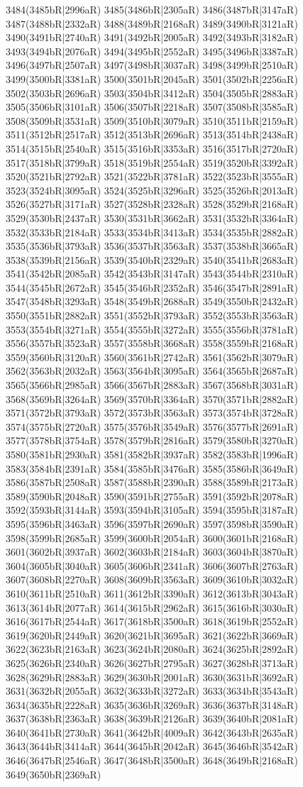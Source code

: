3484(3485bR|2996aR) 3485(3486bR|2305aR) 3486(3487bR|3147aR) 3487(3488bR|2332aR) 3488(3489bR|2168aR) 3489(3490bR|3121aR) 3490(3491bR|2740aR) 3491(3492bR|2005aR) 3492(3493bR|3182aR) 3493(3494bR|2076aR) 3494(3495bR|2552aR) 3495(3496bR|3387aR) 3496(3497bR|2507aR) 3497(3498bR|3037aR) 3498(3499bR|2510aR) 3499(3500bR|3381aR) 3500(3501bR|2045aR) 3501(3502bR|2256aR) 3502(3503bR|2696aR) 3503(3504bR|3412aR) 3504(3505bR|2883aR) 3505(3506bR|3101aR) 3506(3507bR|2218aR) 3507(3508bR|3585aR) 3508(3509bR|3531aR) 3509(3510bR|3079aR) 3510(3511bR|2159aR) 3511(3512bR|2517aR) 3512(3513bR|2696aR) 3513(3514bR|2438aR) 3514(3515bR|2540aR) 3515(3516bR|3353aR) 3516(3517bR|2720aR) 3517(3518bR|3799aR) 3518(3519bR|2554aR) 3519(3520bR|3392aR) 3520(3521bR|2792aR) 3521(3522bR|3781aR) 3522(3523bR|3555aR) 3523(3524bR|3095aR) 3524(3525bR|3296aR) 3525(3526bR|2013aR) 3526(3527bR|3171aR) 3527(3528bR|2328aR) 3528(3529bR|2168aR) 3529(3530bR|2437aR) 3530(3531bR|3662aR) 3531(3532bR|3364aR) 3532(3533bR|2184aR) 3533(3534bR|3413aR) 3534(3535bR|2882aR) 3535(3536bR|3793aR) 3536(3537bR|3563aR) 3537(3538bR|3665aR) 3538(3539bR|2156aR) 3539(3540bR|2329aR) 3540(3541bR|2683aR) 3541(3542bR|2085aR) 3542(3543bR|3147aR) 3543(3544bR|2310aR) 3544(3545bR|2672aR) 3545(3546bR|2352aR) 3546(3547bR|2891aR) 3547(3548bR|3293aR) 3548(3549bR|2688aR) 3549(3550bR|2432aR) 3550(3551bR|2882aR) 3551(3552bR|3793aR) 3552(3553bR|3563aR) 3553(3554bR|3271aR) 3554(3555bR|3272aR) 3555(3556bR|3781aR) 3556(3557bR|3523aR) 3557(3558bR|3668aR) 3558(3559bR|2168aR) 3559(3560bR|3120aR) 3560(3561bR|2742aR) 3561(3562bR|3079aR) 3562(3563bR|2032aR) 3563(3564bR|3095aR) 3564(3565bR|2687aR) 3565(3566bR|2985aR) 3566(3567bR|2883aR) 3567(3568bR|3031aR) 3568(3569bR|3264aR) 3569(3570bR|3364aR) 3570(3571bR|2882aR) 3571(3572bR|3793aR) 3572(3573bR|3563aR) 3573(3574bR|3728aR) 3574(3575bR|2720aR) 3575(3576bR|3549aR) 3576(3577bR|2691aR) 3577(3578bR|3754aR) 3578(3579bR|2816aR) 3579(3580bR|3270aR) 3580(3581bR|2930aR) 3581(3582bR|3937aR) 3582(3583bR|1996aR) 3583(3584bR|2391aR) 3584(3585bR|3476aR) 3585(3586bR|3649aR) 3586(3587bR|2508aR) 3587(3588bR|2390aR) 3588(3589bR|2173aR) 3589(3590bR|2048aR) 3590(3591bR|2755aR) 3591(3592bR|2078aR) 3592(3593bR|3144aR) 3593(3594bR|3105aR) 3594(3595bR|3187aR) 3595(3596bR|3463aR) 3596(3597bR|2690aR) 3597(3598bR|3590aR) 3598(3599bR|2685aR) 3599(3600bR|2054aR) 3600(3601bR|2168aR) 3601(3602bR|3937aR) 3602(3603bR|2184aR) 3603(3604bR|3870aR) 3604(3605bR|3040aR) 3605(3606bR|2341aR) 3606(3607bR|2763aR) 3607(3608bR|2270aR) 3608(3609bR|3563aR) 3609(3610bR|3032aR) 3610(3611bR|2510aR) 3611(3612bR|3390aR) 3612(3613bR|3043aR) 3613(3614bR|2077aR) 3614(3615bR|2962aR) 3615(3616bR|3030aR) 3616(3617bR|2544aR) 3617(3618bR|3500aR) 3618(3619bR|2552aR) 3619(3620bR|2449aR) 3620(3621bR|3695aR) 3621(3622bR|3669aR) 3622(3623bR|2163aR) 3623(3624bR|2080aR) 3624(3625bR|2892aR) 3625(3626bR|2340aR) 3626(3627bR|2795aR) 3627(3628bR|3713aR) 3628(3629bR|2883aR) 3629(3630bR|2001aR) 3630(3631bR|3692aR) 3631(3632bR|2055aR) 3632(3633bR|3272aR) 3633(3634bR|3543aR) 3634(3635bR|2228aR) 3635(3636bR|3269aR) 3636(3637bR|3148aR) 3637(3638bR|2363aR) 3638(3639bR|2126aR) 3639(3640bR|2081aR) 3640(3641bR|2730aR) 3641(3642bR|4009aR) 3642(3643bR|2635aR) 3643(3644bR|3414aR) 3644(3645bR|2042aR) 3645(3646bR|3542aR) 3646(3647bR|2546aR) 3647(3648bR|3500aR) 3648(3649bR|2168aR) 3649(3650bR|2369aR) 